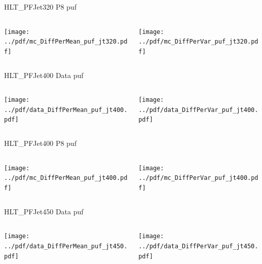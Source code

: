 \documentclass[9pt]{beamer}
\begin{document}
\begin{frame}[t]{HLT\_PFJet320 P8 puf}
\begin{columns}[T]
  \begin{column}{.5\textwidth}
  \texttt{[image: ../pdf/mc\_DiffPerMean\_puf\_jt320.pdf]}
  \end{column}
  \begin{column}{.5\textwidth}
  \texttt{[image: ../pdf/mc\_DiffPerVar\_puf\_jt320.pdf]}
  \end{column}
\end{columns}
\end{frame}

\begin{frame}[t]{HLT\_PFJet400 Data puf}
\begin{columns}[T]
  \begin{column}{.5\textwidth}
  \texttt{[image: ../pdf/data\_DiffPerMean\_puf\_jt400.pdf]}
  \end{column}
  \begin{column}{.5\textwidth}
  \texttt{[image: ../pdf/data\_DiffPerVar\_puf\_jt400.pdf]}
  \end{column}
\end{columns}
\end{frame}

\begin{frame}[t]{HLT\_PFJet400 P8 puf}
\begin{columns}[T]
  \begin{column}{.5\textwidth}
  \texttt{[image: ../pdf/mc\_DiffPerMean\_puf\_jt400.pdf]}
  \end{column}
  \begin{column}{.5\textwidth}
  \texttt{[image: ../pdf/mc\_DiffPerVar\_puf\_jt400.pdf]}
  \end{column}
\end{columns}
\end{frame}

\begin{frame}[t]{HLT\_PFJet450 Data puf}
\begin{columns}[T]
  \begin{column}{.5\textwidth}
  \texttt{[image: ../pdf/data\_DiffPerMean\_puf\_jt450.pdf]}
  \end{column}
  \begin{column}{.5\textwidth}
  \texttt{[image: ../pdf/data\_DiffPerVar\_puf\_jt450.pdf]}
  \end{column}
\end{columns}
\end{frame}
\end{document}
